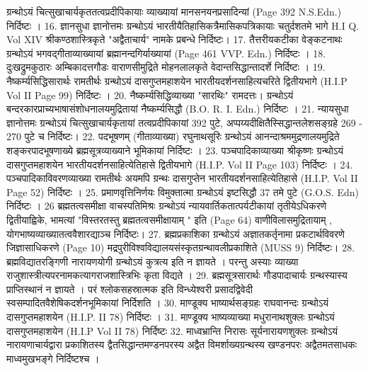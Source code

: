 	ग्रन्थोऽयं चित्सुखाचार्यकृततत्वप्रदीपिकायाः व्याख्यायां मानसनयनप्रसादिन्यां (Page 392 N.S.Edn.) निर्दिष्टः । 
16. ज्ञानसुधा										ज्ञानोत्तमः 
	ग्रन्थोऽयं भारतीयैतिहासिकत्रैमासिकपत्रिकायाः चतुर्दशतमे भागे H.I Q. Vol XIV श्रीकण्ठशास्त्रिकृते "अद्वैताचार्य" नामके प्रबन्धे निर्दिष्टः। 
17. तैत्तरीयकटीका 								वेङ्कटनाथः
	ग्रन्थोऽयं भगवद्गीताव्याख्यायां ब्रह्मानन्दगिर्याख्यायां (Page 461 VVP. Edn.) निर्दिष्टः ।
18. दुःखद्रुमकुठारः 								अम्बिकादत्तगौडः
	वाराणसीमुद्रिते मोहनलालकृते वेदान्तसिद्धान्तादर्शे निर्दिष्टः ।
19. नैष्कर्म्यसिद्धिसारार्थः						रामतीर्थः
	ग्रन्थोऽयं दासगुप्तमहाशयेन भारतीयदर्शनसाहित्यचरिते द्वितीयभागे (H.I.P Vol II Page 99) निर्दिष्टः ।
20. नैष्कर्म्यसिद्धिव्याख्या "सारथिः"			रामदत्तः। 
	ग्रन्थोऽयं बन्दरकारप्राच्यभाषासंशोधनालयमुद्रितायां नैष्कर्म्यसिद्धौ (B.O. R. I. Edn.) निर्दिष्टः । 
21. न्यायसुधा									ज्ञानोत्तमः
	ग्रन्थोऽयं चित्सुखाचार्यकृतायां तत्वप्रदीपिकायां 392 पुटे, अप्पय्यदीक्षितैस्सिद्धान्तलेशसङ्ग्रहे 269 - 270 पुटे च निर्दिष्टः। 
22. पदभूषणम् (गीताव्याख्या)					रघुनाथसूरिः
	ग्रन्थोऽयं आनन्दाश्रममुद्रणालयमुद्रिते शङ्करपादभूषणाख्ये ब्रह्मसूत्रव्याख्याने भूमिकायां निर्दिष्टः । 
23. पञ्चपादिकाव्याख्या 							श्रीकृष्णः
	ग्रन्थोऽयं दासगुप्तमहाशयेन भारतीयदर्शनसाहित्येतिहासे द्वितीयभागे (H.I.P. Vol II Page 103) निर्दिष्टः । 
24. पञ्चपादिकाविवरणव्याख्या					रामतीर्थः
	अयमपि ग्रन्थः	दासगुप्तेन भारतीयदर्शनसाहित्येतिहासे (H.I.P. Vol II Page 52) निर्दिष्टः । 
25. प्रमाणवृत्तिनिर्णयः 							विमुक्तात्मा
	ग्रन्थोऽयं इष्टसिद्धौ 37 तमे पुटे (G.O.S. Edn) निर्दिष्टः । 
26 ब्रह्मतत्वसमीक्षा								वाचस्पतिमिश्रः
	ग्रन्थोऽयं न्यायवार्तिकतात्पर्यटीकायां तृतीयेऽधिकरणे द्वितीयाह्विके, भामत्यां "विस्तरतस्तु ब्रह्मतत्वसमीक्षायाम् " इति (Page 64) वाणीविलासमुद्रितायाम् , योगभाष्यव्याख्यातत्ववैशारद्याञ्च निर्दिष्टः। 
27. ब्रह्मप्रकाशिका
	ग्रन्थोऽयं अज्ञातकर्तृनामा प्रकटार्थविवरणे जिज्ञासाधिकरणे (Page 10) मद्रपुरीविश्वविद्यालयसंस्कृतग्रन्थावलीप्रकाशिते (MUSS 9) निर्दिष्टः। 
28. ब्रह्मविद्यातरङ्गिणी							नारायणयोगी
	ग्रन्थोऽयं कुत्रत्य इति न ज्ञायते । परन्तु अस्याः व्याख्या राजुशास्त्रीत्यपरनामकत्यागराजशास्त्रिभिः कृता विद्यते । 
29. ब्रह्मसूत्रसारार्थः								गौडपादाचार्यः 
	ग्रन्थस्यास्य प्राप्तिस्थानं न ज्ञायते । परं श्लोकसहस्रात्मक इति विन्ध्येश्वरी प्रसादद्विवेदी स्वसम्पादितवैशेषिकदर्शनभूमिकायां निर्दिशति । 
30. माण्डूक्य भाष्यार्थसङ्ग्रहः 					राघवानन्दः
	ग्रन्थोऽयं दासगुप्तमहाशयेन (H.I.P. II 78) निर्दिष्टः । 
31. माण्डूक्य भाष्यव्याख्या						मधुरानाथशुक्लः
	ग्रन्थोऽयं दासगुप्तमहाशयेन (H.I.P Vol II 78) निर्दिष्टः 
32. माध्वभ्रान्ति निरासः							सूर्यनारायणशुक्लः
	ग्रन्थोऽयं नारायणाचार्यद्वारा प्रकाशितस्य द्वैतसिद्धान्तमण्डनपरस्य अद्वैत विमर्शाख्यग्रन्थस्य खण्डनपरः अद्वैतमतसाधकः माध्वमुखभङ्गे निर्दिष्टश्च । 
